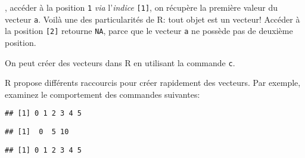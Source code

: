\noindent, accéder à la position \texttt{1} \emph{via} l'\emph{indice} \texttt{[1]}, on récupère la première valeur du vecteur \texttt{a}.
Voilà une des particularités de R: tout objet est un vecteur!
Accéder à la position \texttt{[2]} retourne \texttt{NA}, parce que le vecteur \texttt{a} ne possède pas de deuxième position.

On peut créer des vecteurs dans R en utilisant la commande \texttt{c}.

\begin{knitrout}
\color{fgcolor}\begin{kframe}
\begin{flushleft}
\ttfamily\noindent
{}\hlassignement{=}{\ }\hlkeyword{(}\hlkeyword{,}{\ }\hlkeyword{,}{\ }\hlkeyword{,}{\ }\hlkeyword{,}{\ }\hlkeyword{)}\mbox{}
\normalfont
\end{flushleft}
\end{kframe}
\end{knitrout}


R propose différents raccourcis pour créer rapidement des vecteurs.
Par exemple, examinez le comportement des commandes suivantes:

\begin{knitrout}
\color{fgcolor}\begin{kframe}
\begin{flushleft}
\ttfamily\noindent
{}\hlkeyword{(}\hlargument{=}{\ }\hlkeyword{,}{\ }\hlargument{=}{\ }\hlkeyword{,}{\ }\hlargument{=}{\ }\hlkeyword{)}\mbox{}
\normalfont
\end{flushleft}
\begin{verbatim}
## [1] 0 1 2 3 4 5
\end{verbatim}
\begin{flushleft}
\ttfamily\noindent
{}\hlkeyword{(}\hlargument{=}{\ }\hlkeyword{,}{\ }\hlargument{=}{\ }\hlkeyword{,}{\ }\hlargument{=}{\ }\hlkeyword{)}\mbox{}
\normalfont
\end{flushleft}
\begin{verbatim}
## [1]  0  5 10
\end{verbatim}
\begin{flushleft}
\ttfamily\noindent
{}\hlkeyword{(}\hlkeyword{:}\hlkeyword{)}\mbox{}
\normalfont
\end{flushleft}
\begin{verbatim}
## [1] 0 1 2 3 4 5
\end{verbatim}
\end{kframe}
\end{knitrout}



